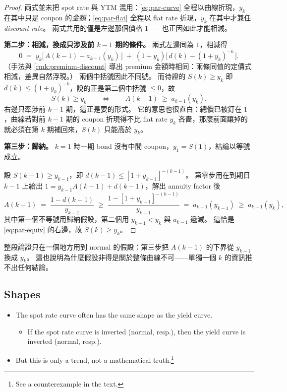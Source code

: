 \begin{proof}
	兩式並未把 spot rate 與 YTM 混用：\eqref{eq:par-curve} 全程以曲線折現，$y_{k}$ 在其中只是 coupon 的\emph{金額}；\eqref{eq:par-flat} 全程以 flat rate 折現，$y_{k}$ 在其中才兼任 \emph{discount rate}。
	兩式共用的僅是左邊那個價格 $1$——也正因如此才能相減。

	\textbf{第二步：相減，換成只涉及前 $k-1$ 期的條件。}
	兩式左邊同為 $1$，相減得
	\begin{equation}
		0 \;=\; y_{k}\bigl[\,A(k-1)-a_{k-1}(y_{k})\,\bigr] \;+\; (1+y_{k})\bigl[\,d(k)-(1+y_{k})^{-k}\,\bigr] . \label{eq:par-gap}
	\end{equation}
	（手法與 \autoref{rmk:premium-discount} 導出 premium 金額時相同：兩條同值的定價式相減，差異自然浮現。）
	兩個中括號因此不同號。
	而待證的 $S(k)\ge y_{k}$ 即 $d(k)\le(1+y_{k})^{-k}$，說的正是第二個中括號 $\le 0$，故
	\begin{equation}
		S(k)\ge y_{k}
		\qquad\Longleftrightarrow\qquad
		A(k-1) \;\ge\; a_{k-1}(y_{k}) . \label{eq:par-equiv}
	\end{equation}
	右邊只牽涉前 $k-1$ 期，這正是要的形式。
	它的意思也很直白：總價已被釘在 $1$，曲線若對前 $k-1$ 期的 coupon 折現得不比 flat rate $y_{k}$ 吝嗇，那麼前面讓掉的就必須在第 $k$ 期補回來，$S(k)$ 只能高於 $y_{k}$。

	\textbf{第三步：歸納。}
	$k=1$ 時一期 bond 沒有中間 coupon，$y_{1}=S(1)$，結論以等號成立。

	設 $S(k-1)\ge y_{k-1}$，即 $d(k-1)\le[1+y_{k-1}]^{-(k-1)}$。
	第零步用在到期日 $k-1$ 上給出 $1=y_{k-1}A(k-1)+d(k-1)$，解出 annuity factor 後
	\[
		A(k-1) \;=\; \frac{1-d(k-1)}{y_{k-1}}
		\;\ge\; \frac{1-[1+y_{k-1}]^{-(k-1)}}{y_{k-1}}
		\;=\; a_{k-1}(y_{k-1})
		\;\ge\; a_{k-1}(y_{k}) ,
	\]
	其中第一個不等號用歸納假設，第二個用 $y_{k-1}<y_{k}$ 與 $a_{k-1}$ 遞減。
	這恰是 \eqref{eq:par-equiv} 的右邊，故 $S(k)\ge y_{k}$。
\end{proof}

整段論證只在一個地方用到 normal 的假設：第三步把 $A(k-1)$ 的下界從 $y_{k-1}$ 換成 $y_{k}$。
這也說明為什麼假設非得是關於整條曲線不可——單獨一個 $k$ 的資訊推不出任何結論。
\suppend

\subsection{Shapes}


\begin{itemize}[nosep]
	\item The spot rate curve often has the same shape as the yield curve.
	      \begin{itemize}[nosep]
		      \item If the spot rate curve is inverted (normal, resp.), then the yield curve is inverted (normal, resp.).
	      \end{itemize}
	\item But this is only a trend, not a mathematical truth.\footnote{See a counterexample in the text.}
\end{itemize}

